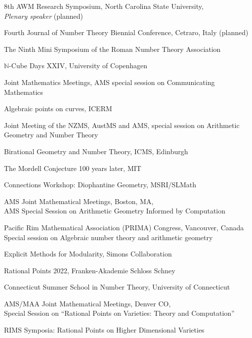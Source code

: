 \documentclass[12pt]{article}
\newenvironment{date_section}
	{
	\vspace{-1ex}
	\leftmargini = 15ex
	 \begin{itemize}[
		 labelsep = *,
		 labelwidth = 9ex,
		 labelindent = 0ex,
		 itemindent = !,
		 font=\normalfont, 
		 align=parleft
		 ]
		{}
		\itemsep=-1.5mm}
	{\end{itemize}\vspace{-2ex}}
\newcommand{\yearmo}[2]{
	\item[ 
		{\makebox[1ex][r]{#1}}
		\hspace{1ex}
		{\makebox[1ex][l]{#2} }
		] }
\begin{document}
		\begin{date_section}
			\yearmo{}{2027} 8th AWM Research Symposium, North Carolina State University, \\
			\textit{Plenary speaker} (planned)
			\yearmo{}{2026} Fourth Journal of Number Theory Biennial Conference, Cetraro, Italy (planned)
			\yearmo{}{} The Ninth Mini Symposium of the Roman Number Theory Association 
			\yearmo{}{} \(\mathbb{N}\)-Cube Days XXIV, University of Copenhagen 
			\yearmo{}{} Joint Mathematics Meetings, AMS special session on Communicating Mathematics
			\yearmo{}{2025} Algebraic points on curves, ICERM
			\yearmo{}{2024}
			Joint Meeting of the NZMS, AustMS and AMS, special session on Arithmetic Geometry and Number Theory 
			\yearmo{}{}
			Birational Geometry and Number Theory, ICMS, Edinburgh 
			\yearmo{}{}
			The Mordell Conjecture 100 years later, MIT


			\yearmo{}{2023}
			Connections Workshop: Diophantine Geometry, MSRI/SLMath

			\yearmo{}{}
			AMS Joint Mathematical Meetings, Boston, MA,\\
			AMS Special Session on Arithmetic Geometry Informed by Computation

			\yearmo{}{2022}
			Pacific Rim Mathematical Association (PRIMA) Congress, Vancouver, Canada\\
			Special session on Algebraic number theory and arithmetic geometry

			\yearmo{}{}
			Explicit Methods for Modularity, Simons Collaboration

			\yearmo{}{}
			Rational Points 2022, Franken-Akademie Schloss Schney

			\yearmo{}{2020} Connecticut Summer School in Number Theory, University of Connecticut

			\yearmo{}{}
			AMS/MAA Joint Mathematical Meetings, Denver CO,\\
			Special Session on ``Rational Points on Varieties: Theory and Computation''


			\yearmo{}{2019}
			RIMS Symposia: Rational Points on Higher Dimensional Varieties



\end{date_section}
\end{document}
